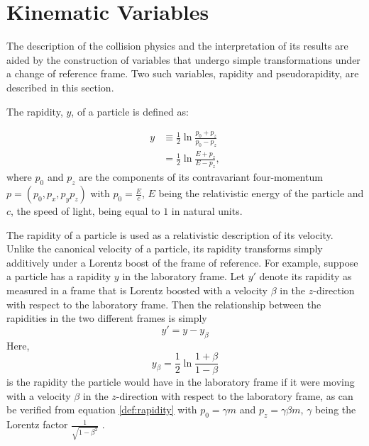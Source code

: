 
\section{Kinematic Variables}\label{app:kinVar}
The description of the collision physics and the interpretation of its results are aided by the construction of variables that undergo simple transformations under a change of reference frame. Two such variables, rapidity and pseudorapidity, are described in this section.

The rapidity, $y$, of a particle is defined as:

	\begin{align}\label{def:rapidity}
	y &\equiv \frac{1}{2}\ln{\frac{p_{0} + p_{z}}{p_{0} - p_{z}}}\\
	&= \frac{1}{2}\ln{\frac{E + p_{z}}{E - p_{z}}},
	\end{align}
where $p_{0}$ and $p_{z}$ are the components of its contravariant four-momentum $p = (p_{0}, p_{x}, p_{y} p_{z})$ with $p_{0} = \frac{E}{c}$, $E$ being the relativistic energy of the particle and $c$, the speed of light, being equal to $1$ in natural units.

The rapidity of a particle is used as a relativistic description of its velocity. Unlike the canonical velocity of a particle, its rapidity transforms simply additively under a Lorentz boost of the frame of reference. For example, suppose a particle has a rapidity $y$ in the laboratory frame. Let $y'$ denote its rapidity as measured in a frame that is Lorentz boosted with a velocity $\beta$ in the $z$-direction with respect to the laboratory frame. Then the relationship between the rapidities in the two different frames is simply
	\begin{equation}\label{eqn:rapidityTransformation}
	y' = y - y_{\beta}
	\end{equation}
Here,
	\begin{equation}
	y_{\beta} = \frac{1}{2}\ln{\frac{1 + \beta}{1 - \beta}}
	\end{equation}
is the rapidity the particle would have in the laboratory frame if it were moving with a velocity $\beta$ in the $z$-direction with respect to the laboratory frame, as can be verified from equation \ref{def:rapidity} with $p_{0} = \gamma m$ and $p_{z} = \gamma \beta m$, $\gamma$ being the Lorentz factor $\frac{1}{\sqrt{1 - \beta^2}}$ \cite{wong1994introduction}.

